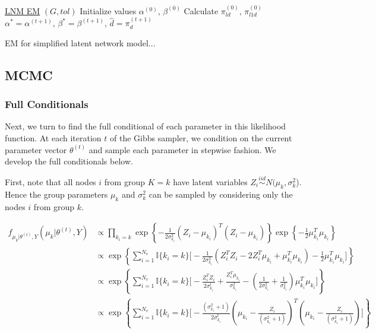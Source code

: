 \documentclass{article}
\begin{document}
\begin{algorithm*}\label{EM_alg}
    \underline{LNM EM} $(G, tol)$\;
    Initialize values $\alpha^{(0)}$, $\beta^{(0)}$\;
    Calculate $\pi^{(0)}_{ld}$, $\pi^{(0)}_{l1d}$\;
     \Return $\alpha^* = \alpha^{(t+1)}$, $\beta^* = \beta^{(t+1)}$, $\hat{d} = \pi_d^{(t+1)}$\
    \caption{EM for simplified latent network model...}
\end{algorithm*}

\subsection{MCMC}\label{MCMC}
\subsubsection{Full Conditionals}
Next, we turn to find the full conditional of each parameter in this likelihood function. At each iteration $t$ of the Gibbs sampler, we condition on the current parameter vector $\theta^{(t)}$ and sample each parameter in stepwise fashion. We develop the full conditionals below.

First, note that all nodes $i$ from group $K = k$ have latent variables $Z_i \overset{iid}\sim N(\mu_k, \sigma_k^2$). Hence the group parameters $\mu_k$ and $\sigma^2_k$ can be sampled by considering only the nodes $i$ from group $k$.

\begin{align*}
f_{\mu_{k}|\theta^{(t)}, Y}(\mu_k|\theta^{(t)},Y) &\propto \prod_{k_i = k} \exp\left\{-\frac{1}{2\sigma_{k_i}^2}(Z_i - \mu_{k_i})^T(Z_i - \mu_{k_i})\right\}\exp\left\{-\frac{1}{2}\mu_{k_i}^T\mu_{k_i}\right\}\\
&\propto \exp\left\{\sum_{i = 1}^{N_v}\mathbb{I}\{k_i = k\} \Big[-\frac{1}{2\sigma_{k_i}^2}(Z_i^TZ_i - 2Z_i^T\mu_{k_i} + \mu_{k_i}^T\mu_{k_i}) - \frac{1}{2}\mu_{k_i}^T\mu_{k_i} \Big]\right\}\\
&\propto\exp\left\{\sum_{i = 1}^{N_v}\mathbb{I}\{k_i = k\} \Big[-\frac{Z_i^TZ_i}{2\sigma_{k_i}^t} + \frac{Z_i^T\mu_{k_i}}{\sigma_{k_i}^2} - \left(\frac{1}{2\sigma_{k_i}^2} + \frac{1}{\sigma_{k_i}^2}\right)\mu_{k_i}^T\mu_{k_i} \Big] \right\}\\
&\propto\exp\left\{\sum_{i = 1}^{N_v}\mathbb{I}\{k_i = k\} \Big[-\frac{(\sigma_{k_i}^2+1)}{2\sigma_{k_i}^t}\left(\mu_{k_i}-\frac{Z_i}{(\sigma_{k_i}^2+1)}\right)^T\left(\mu_{k_i}-\frac{Z_i}{(\sigma_{k_i}^2+1)}\right)\Big]\right\}\\
\end{align*}
\end{document}
